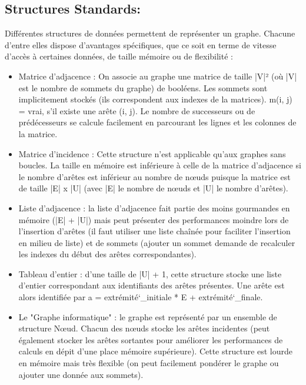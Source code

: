 \documentclass[12pt]{article}
\begin{document}
\subsection{Structures Standards:}
Différentes structures de données permettent de représenter un graphe. Chacune d'entre elles dispose d'avantages spécifiques, que ce soit en terme de vitesse d'accès à certaines données, de taille mémoire ou de flexibilité :\\  \begin{itemize}
\item Matrice d'adjacence : On associe au graphe une matrice de taille |V|² (où |V| est le nombre de sommets du graphe) de booléens. Les sommets sont implicitement stockés (ils correspondent aux indexes de la matrices). m(i, j) = vrai, s'il existe une arête (i, j). 
Le nombre de successeurs ou de prédécesseurs se calcule facilement en parcourant les lignes et les colonnes de la matrice.\\
\item Matrice d'incidence : Cette structure n'est applicable qu'aux graphes sans boucles. La taille en mémoire est inférieure à celle de la matrice d'adjacence si le nombre d'arêtes est inférieur au nombre de nœuds puisque la matrice est de taille |E| x |U| (avec |E| le nombre de nœuds et |U| le nombre d'arêtes).\\
\item Liste d'adjacence : la liste d'adjacence fait partie des moins gourmandes en mémoire (|E| + |U|) mais peut présenter des performances moindre lors de l'insertion d'arêtes (il faut utiliser une liste chaînée pour faciliter l'insertion en milieu de liste) et de sommets (ajouter un sommet demande de recalculer les indexes du début des arêtes correspondantes).\\
\item Tableau d'entier : d'une taille de |U| + 1, cette structure stocke une liste d'entier correspondant aux identifiants des arêtes présentes. Une arête est alors identifiée par a = extrémité\char`_initiale * E + extrémité\char`_finale.\\
\item Le "Graphe informatique" : le graphe est représenté par un ensemble de structure Nœud. Chacun des nœuds stocke les arêtes incidentes (peut également stocker les arêtes sortantes pour améliorer les performances de calculs en dépit d'une place mémoire supérieure).
Cette structure est lourde en mémoire mais très flexible (on peut facilement pondérer le graphe ou ajouter une donnée aux sommets). \\
\end{itemize}
\end{document}
